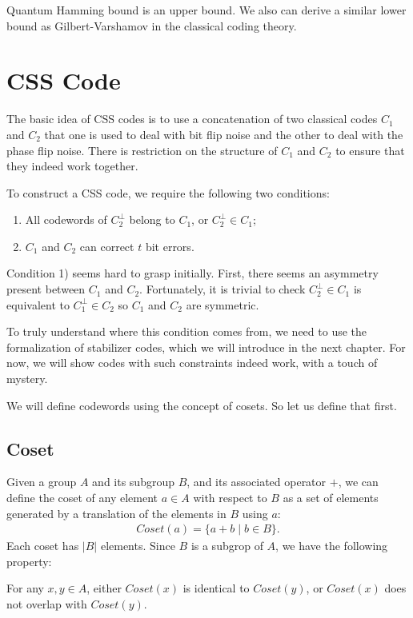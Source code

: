 Quantum Hamming bound is an upper bound. We also can derive a similar lower bound as Gilbert-Varshamov in the classical coding theory. 

\section{CSS Code}
The basic idea of CSS codes is to use a concatenation of two classical codes \(C_1\) and \(C_2\) that one is used to deal with bit flip noise and the other to deal with the phase flip noise. There is restriction on the structure of \(C_1\) and \(C_2\) to ensure that they indeed work together. 


To construct a CSS code, we require the following two conditions:
\begin{enumerate}
    \item All codewords of \(C_2^{\perp}\) belong to \(C_1\), or \(C_2^{\perp} \in C_1\); 
    \item \(C_1\) and \(C_2\) can correct \(t\) bit errors.
\end{enumerate}

Condition 1) seems hard to grasp initially. First, there seems an asymmetry present between \(C_1\) and \(C_2\).  Fortunately, it is trivial to check \(C_2^{\perp} \in C_1\) is equivalent to \(C_1^{\perp} \in C_2\) so \(C_1\) and \(C_2\) are symmetric. 

To truly understand where this condition comes from, we need to use the formalization of stabilizer codes, which we will introduce in the next chapter. For now, we will show codes with such constraints indeed work, with a touch of mystery. 

We will define codewords using the concept of cosets. So let us define that first. 

\subsection{Coset}
Given a group \(A\) and its subgroup \(B\), and its associated operator \(+\), we can define the coset of any element \(a \in A\) with respect to \(B\) as a set of elements generated by a translation of the elements in \(B\) using \(a\):
\begin{align*}
Coset(a) = \{a + b \;|\; b \in B\}.
\end{align*}
Each coset has \(|B|\) elements. Since \(B\) is a subgrop of \(A\), we have the following property:
\begin{theorem}
    For any \(x, y \in A\), either \( Coset(x)\) is identical to \(Coset(y)\), or \(Coset(x)\) does not overlap with \(Coset(y).\)
\end{theorem}


